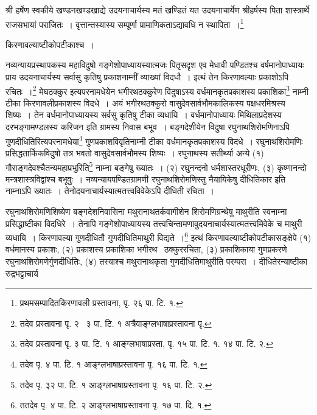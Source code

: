 \documentclass[11pt, openany]{book}
\begin{document}
\newpage
\noindent
{\knu श्री हर्षेण} स्वकीये खण्डनखण्डखाद्ये उदयनाचार्यस्य मतं खण्डितं यत उदयनाचार्येण श्रीहर्षस्य पिता शास्त्रार्थे राजसभायां पराजितः~। वृत्तान्तस्यास्य सम्पूर्णा प्रामाणिकताऽद्यावधि न स्थापिता~।\renewcommand{\thefootnote}{४३}\footnote{प्रथमसम्पादितकिरणावली प्रस्तावना, पृ. २६ पा. टि. १.}

\noindent
{\knu किरणावल्याष्टीकोपटीकाश्च~।}

नव्यन्यायप्रस्थापकस्य महाविदुषो {\knu गङ्गेशोपाध्यायस्या}त्मजः पितृसदृश एव मेधावी पण्डितश्च वर्षमानोपाध्यायः प्राय उदयनाचार्यस्य सर्वासु कृतिषु {\knu प्रकाश}नाम्नीं व्याख्यां विदधौ~। इत्थं तेन {\knu किरणावल्याः प्रकाशो}ऽपि रचितः~।\renewcommand{\thefootnote}{४४}\footnote{तदेव प्रस्तावना पृ. २  \textendash\ ३ पा. टि. १ अत्रैवाङ्ग्लभाषाप्रस्तावना पृ.} {\knu मेघठक्कुर} इत्यपरनामधेयेन {\knu भगीरथठक्कुरे}ण विदुषाऽस्य {\knu वर्धमानकृतप्रकाशस्य प्रकाशिका}\renewcommand{\thefootnote}{४५}\footnote{तदेव प्रस्तावना पृ. ३ पा. टि. १ आङ्ग्लभाषाप्रस्ता, पृ. १५ पा. टि. १. १४ पा. टि. २.} नाम्नी टीका किरणावलीप्रकाशस्य विदधे~। अयं {\knu भगीरथठक्कुरो वासुदेवसार्वभौम}कालिकस्य पक्षधरमिश्रस्य शिष्यः~। तेन वर्धमानोपाध्यायस्य सर्वसु कृतिषु टीका व्यधायि~। वर्धमानोपाध्यायः मिथिलाप्रदेशस्य दरभङ्गामण्डलस्य {\knu करिजन} इति ग्रामस्य निवास बभूव~। बङ्गदेशीयेन विदुषा {\knu रघुनाथशिरोमणिना}ऽपि {\knu गुणदीधिति}रित्यपरनामधेया\renewcommand{\thefootnote}{४६}\footnote{तदेव पृ. ४ पा. टि. १ आङ्ग्लभाषाप्रस्तावना पृ. १६ पा. टि. १.} {\knu गुणप्रकाश}विवृतिनाम्नी टीका वर्धमानकृतप्रकाशस्य विदधे~। {\knu रघुनाथशिरोमणिः} प्रसिद्धतार्किकविदुषो तत्र भवतो {\knu वासुदेवसार्वभौमस्य} शिष्यः~। रघुनाथस्य सतीर्थ्या अन्ये (१) {\knu गौराङ्गदेवश्चैतन्यमहाप्रभुरिति}\renewcommand{\thefootnote}{४७}\footnote{तदेव पृ. ३२ पा. टि. १ आङ्ग्लभाषाप्रस्तावना पृ. १६ पा. टि. २.} नाम्ना बङ्गेषु ख्यातः~। (२) {\knu रघुनन्दनो} धर्मशास्तरधूरीणः, (३) {\knu कृष्णानन्दो} मन्त्रशास्त्रविद्वांश्च बभूवुः~। नव्यन्यायपण्डितग्रामणी {\knu रघुनाथशिरोमणिस्तु} नैयायिकेषु {\knu दीधितिकार} इति नाम्नाऽपि ख्यातः~। {\knu तेनोदयनाचार्यस्यात्मतत्त्वविवेके}ऽपि दीधिती रचिता~।

रघुनाथशिरोमणिशिष्येण बङ्गदेशनिवासिना {\knu मथुरानाथतर्कवागीशेन} शिरोमणिग्रन्थेषु {\knu माथुरीति} स्वनाम्ना प्रसिद्धाष्टीका विदधिरे~। तेनापि {\knu गङ्गेशोपाध्यायस्य तत्त्वचिन्तामणा}वुदयनाचार्यस्यात्मतत्त्वमिवेके च माथुरी व्यधायि~। किरणावल्या गुणदीधितौ {\knu गुणदीधितिमाथुरी} विद्यते~।\renewcommand{\thefootnote}{४८}\footnote{ततदेव पृ. ४ पा. टि. २ आङ्ग्लभाषाप्रस्तावना पृ. १७ पा. दि. १.} इत्थं किरणावल्याष्टीकोपटीकासङ्क्षेपे (१) वर्धमानस्य प्रकाशः, (२) प्रकाशस्य प्रकाशिका भगीरथ \textendash\ ठक्कुररचिता, (३) प्रकाशिकाया गुणप्रकरणे रघुनाथशिरोमणेर्गुणदीधितिः, (४) तस्याश्च मथुरानाथकृता गुणदीधितिमाथुरीति परम्परा~। दीधितेरन्याष्टीका {\knu रुद्रभट्टाचार्य \textendash\ }
\end{document}
